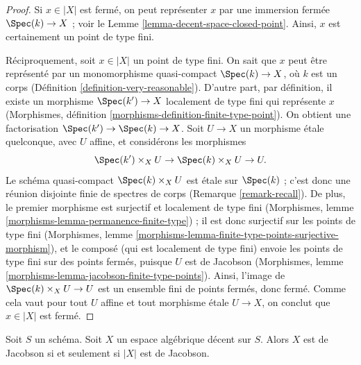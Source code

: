 \begin{proof}
Si $x \in |X|$ est fermé, on peut représenter $x$ par une immersion fermée
$\Spec(k) \to X$ ; voir le Lemme \ref{lemma-decent-space-closed-point}.
Ainsi, $x$ est certainement un point de type fini.

\medskip\noindent
Réciproquement, soit $x \in |X|$ un point de type fini. On sait que $x$ peut
être représenté par un monomorphisme quasi-compact $\Spec(k) \to X$, où $k$
est un corps (Définition \ref{definition-very-reasonable}). D'autre part, par
définition, il existe un morphisme $\Spec(k') \to X$ localement de type fini
qui représente $x$
(Morphismes, définition \ref{morphisms-definition-finite-type-point}).
On obtient une factorisation $\Spec(k') \to \Spec(k) \to X$.
Soit $U \to X$ un morphisme étale quelconque, avec $U$ affine, et considérons
les morphismes
$$
\Spec(k') \times_X U \to \Spec(k) \times_X U \to U.
$$
Le schéma quasi-compact $\Spec(k) \times_X U$ est étale sur $\Spec(k)$ ;
c'est donc une réunion disjointe finie de spectres de corps
(Remarque \ref{remark-recall}). De plus, le premier morphisme est surjectif
et localement de type fini
(Morphismes, lemme \ref{morphisms-lemma-permanence-finite-type}) ;
il est donc surjectif sur les points de type fini
(Morphismes, lemme
\ref{morphisms-lemma-finite-type-points-surjective-morphism}), et le composé
(qui est localement de type fini) envoie les points de type fini sur des
points fermés, puisque $U$ est de Jacobson
(Morphismes, lemme \ref{morphisms-lemma-jacobson-finite-type-points}).
Ainsi, l'image de $\Spec(k) \times_X U \to U$ est un ensemble fini de points
fermés, donc fermé. Comme cela vaut pour tout $U$ affine et tout morphisme
étale $U \to X$, on conclut que $x \in |X|$ est fermé.
\end{proof}

\begin{lemma}
\label{lemma-decent-Jacobson}
Soit $S$ un schéma. Soit $X$ un espace algébrique décent sur $S$.
Alors $X$ est de Jacobson si et seulement si $|X|$ est de Jacobson.
\end{lemma}

